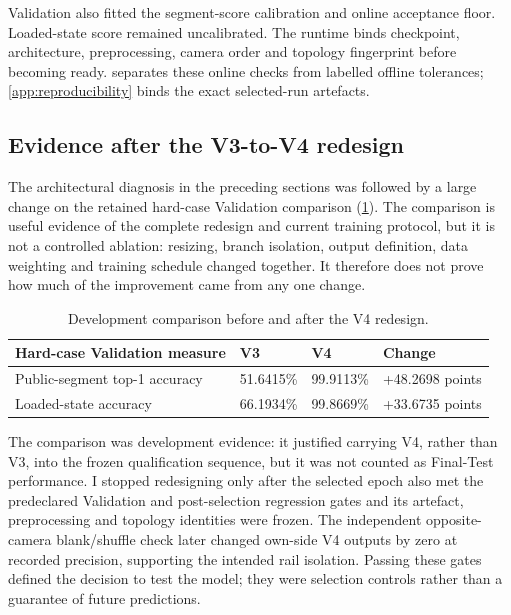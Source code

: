Validation also fitted the segment-score calibration and online acceptance
floor. Loaded-state score remained uncalibrated. The runtime binds checkpoint,
architecture, preprocessing, camera order and topology fingerprint before
becoming ready.  separates these online checks
from labelled offline tolerances; \cref{app:reproducibility} binds the exact
selected-run artefacts.

\subsection{Evidence after the V3-to-V4 redesign}

The architectural diagnosis in the preceding sections was followed by a large
change on the retained hard-case Validation comparison
(\cref{tab:v3-v4-development-comparison}). The comparison is useful evidence of
the complete redesign and current training protocol, but it is not a controlled
ablation: resizing, branch isolation, output definition, data weighting and
training schedule changed together. It therefore does not prove how much of the
improvement came from any one change.

\begin{table}[htbp]
\centering
\small
\caption{Development comparison before and after the V4 redesign.}
\label{tab:v3-v4-development-comparison}
\begin{tabularx}{\textwidth}{@{}p{}p{}p{}X@{}}
\toprule
\textbf{Hard-case Validation measure} & \textbf{V3} & \textbf{V4} &
\textbf{Change}\\
\midrule
Public-segment top-1 accuracy & 51.6415\% & 99.9113\% & +48.2698 points\\
\tablerowrule
Loaded-state accuracy & 66.1934\% & 99.8669\% & +33.6735 points\\
\bottomrule
\end{tabularx}
\end{table}

The comparison was development evidence: it justified carrying V4, rather than
V3, into the frozen qualification sequence, but it was not counted as Final-Test
performance. I stopped redesigning only after the selected epoch also met the
predeclared Validation and post-selection regression gates and its artefact,
preprocessing and topology identities were frozen. The independent
opposite-camera blank/shuffle check later changed own-side V4 outputs by zero at
recorded precision, supporting the intended rail isolation. Passing these gates
defined the decision to test the model; they were selection controls rather
than a guarantee of future predictions.

